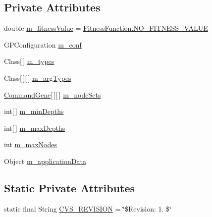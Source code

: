 \subsection*{Private Attributes}
\begin{DoxyCompactItemize}
\item 
double \hyperlink{classorg_1_1jgap_1_1gp_1_1_g_p_program_base_a036a159a751b60bee86a61a218d1508d}{m\-\_\-fitness\-Value} = \hyperlink{classorg_1_1jgap_1_1_fitness_function_a5f1f23e6f8a0f9606aee5d52fac6a06b}{Fitness\-Function.\-N\-O\-\_\-\-F\-I\-T\-N\-E\-S\-S\-\_\-\-V\-A\-L\-U\-E}
\item 
G\-P\-Configuration \hyperlink{classorg_1_1jgap_1_1gp_1_1_g_p_program_base_a3e354b60e3bffd4b0fd3763dffb1c926}{m\-\_\-conf}
\item 
Class\mbox{[}$\,$\mbox{]} \hyperlink{classorg_1_1jgap_1_1gp_1_1_g_p_program_base_aa46237569115e11c220ea2905dee3171}{m\-\_\-types}
\item 
Class\mbox{[}$\,$\mbox{]}\mbox{[}$\,$\mbox{]} \hyperlink{classorg_1_1jgap_1_1gp_1_1_g_p_program_base_a5360cf00e8d3559d8366a876596456d9}{m\-\_\-arg\-Types}
\item 
\hyperlink{classorg_1_1jgap_1_1gp_1_1_command_gene}{Command\-Gene}\mbox{[}$\,$\mbox{]}\mbox{[}$\,$\mbox{]} \hyperlink{classorg_1_1jgap_1_1gp_1_1_g_p_program_base_a4b5f7314b15e61af62db7ac04992776b}{m\-\_\-node\-Sets}
\item 
int\mbox{[}$\,$\mbox{]} \hyperlink{classorg_1_1jgap_1_1gp_1_1_g_p_program_base_af156fd7fa6c12f13684ab5091316b18d}{m\-\_\-min\-Depths}
\item 
int\mbox{[}$\,$\mbox{]} \hyperlink{classorg_1_1jgap_1_1gp_1_1_g_p_program_base_aec6460fd2ab63254e04f0729c7a60783}{m\-\_\-max\-Depths}
\item 
int \hyperlink{classorg_1_1jgap_1_1gp_1_1_g_p_program_base_a9f3daf47a4ce44801a763774b6144657}{m\-\_\-max\-Nodes}
\item 
Object \hyperlink{classorg_1_1jgap_1_1gp_1_1_g_p_program_base_a9ef4ec5ae5c5f28ae0ce01770145d14b}{m\-\_\-application\-Data}
\end{DoxyCompactItemize}
\subsection*{Static Private Attributes}
\begin{DoxyCompactItemize}
\item 
static final String \hyperlink{classorg_1_1jgap_1_1gp_1_1_g_p_program_base_a2dc3eaded7e86b4f604e561607a3a0c4}{C\-V\-S\-\_\-\-R\-E\-V\-I\-S\-I\-O\-N} = \char`\"{}\$Revision\-: 1. \$\char`\"{}
\end{DoxyCompactItemize}
